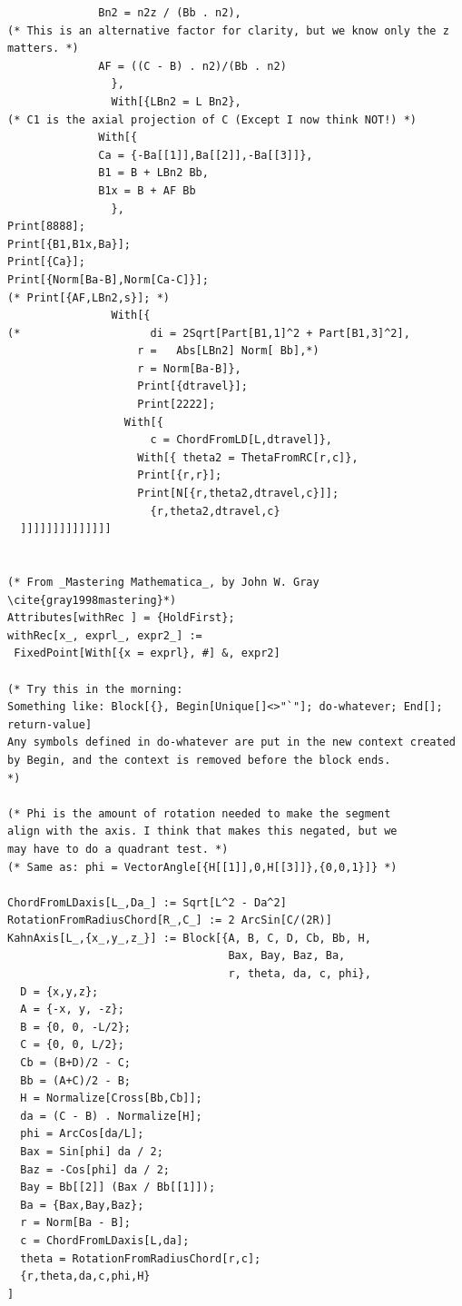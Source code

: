 \documentclass[11pt]{article}
\begin{document}
{\begin{verbatim}
              Bn2 = n2z / (Bb . n2),
(* This is an alternative factor for clarity, but we know only the z matters. *)
              AF = ((C - B) . n2)/(Bb . n2) 
                },
                With[{LBn2 = L Bn2},
(* C1 is the axial projection of C (Except I now think NOT!) *)
              With[{
              Ca = {-Ba[[1]],Ba[[2]],-Ba[[3]]},
              B1 = B + LBn2 Bb,
              B1x = B + AF Bb
                },
Print[8888];
Print[{B1,B1x,Ba}];
Print[{Ca}];
Print[{Norm[Ba-B],Norm[Ca-C]}];
(* Print[{AF,LBn2,s}]; *)
                With[{
(*                    di = 2Sqrt[Part[B1,1]^2 + Part[B1,3]^2],
                    r =   Abs[LBn2] Norm[ Bb],*)
                    r = Norm[Ba-B]},
                    Print[{dtravel}];
                    Print[2222];
                  With[{
                      c = ChordFromLD[L,dtravel]},
                    With[{ theta2 = ThetaFromRC[r,c]},
                    Print[{r,r}];
                    Print[N[{r,theta2,dtravel,c}]];
                      {r,theta2,dtravel,c}
  ]]]]]]]]]]]]]]


(* From _Mastering Mathematica_, by John W. Gray \cite{gray1998mastering}*)
Attributes[withRec ] = {HoldFirst}; 
withRec[x_, exprl_, expr2_] := 
 FixedPoint[With[{x = exprl}, #] &, expr2]

(* Try this in the morning:
Something like: Block[{}, Begin[Unique[]<>"`"]; do-whatever; End[]; return-value]
Any symbols defined in do-whatever are put in the new context created by Begin, and the context is removed before the block ends.
*)

(* Phi is the amount of rotation needed to make the segment 
align with the axis. I think that makes this negated, but we 
may have to do a quadrant test. *)
(* Same as: phi = VectorAngle[{H[[1]],0,H[[3]]},{0,0,1}]} *)

ChordFromLDaxis[L_,Da_] := Sqrt[L^2 - Da^2]
RotationFromRadiusChord[R_,C_] := 2 ArcSin[C/(2R)]
KahnAxis[L_,{x_,y_,z_}] := Block[{A, B, C, D, Cb, Bb, H,
                                  Bax, Bay, Baz, Ba, 
                                  r, theta, da, c, phi},
  D = {x,y,z};
  A = {-x, y, -z};
  B = {0, 0, -L/2};
  C = {0, 0, L/2};
  Cb = (B+D)/2 - C;
  Bb = (A+C)/2 - B;
  H = Normalize[Cross[Bb,Cb]];
  da = (C - B) . Normalize[H];
  phi = ArcCos[da/L];
  Bax = Sin[phi] da / 2;
  Baz = -Cos[phi] da / 2;
  Bay = Bb[[2]] (Bax / Bb[[1]]);
  Ba = {Bax,Bay,Baz};
  r = Norm[Ba - B];
  c = ChordFromLDaxis[L,da];
  theta = RotationFromRadiusChord[r,c];
  {r,theta,da,c,phi,H}
]






\end{verbatim}}
\end{document}
